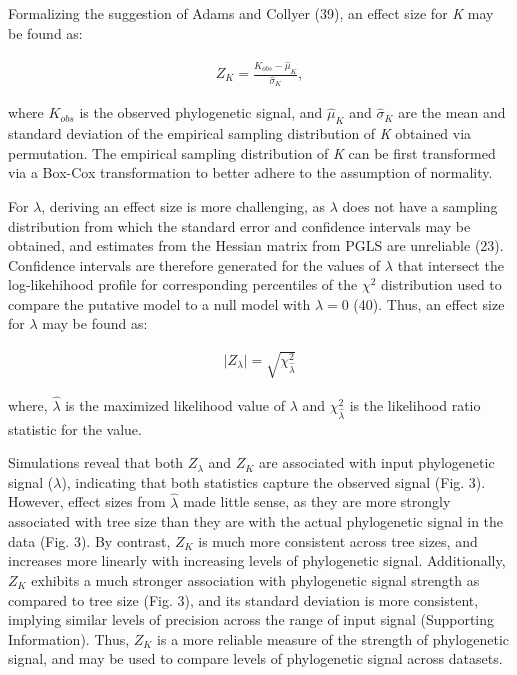 \documentclass[9pt,twocolumn,twoside,lineno]{pnas-new}
\begin{document}
Formalizing the suggestion of Adams and Collyer (39), an effect size for
\emph{K} may be found as:

\begin{align}
    Z_K=\frac{K_{obs}-\hat\mu_{K}}{\hat\sigma_{K}},
\end{align}

where \(K_{obs}\) is the observed phylogenetic signal, and \(\hat\mu_K\)
and \(\hat\sigma_K\) are the mean and standard deviation of the
empirical sampling distribution of \emph{K} obtained via permutation.
The empirical sampling distribution of \emph{K} can be first transformed
via a Box-Cox transformation to better adhere to the assumption of
normality.

For \(\lambda\), deriving an effect size is more challenging, as
\(\lambda\) does not have a sampling distribution from which the
standard error and confidence intervals may be obtained, and estimates
from the Hessian matrix from PGLS are unreliable (23). Confidence
intervals are therefore generated for the values of \(\lambda\) that
intersect the log-likehihood profile for corresponding percentiles of
the \(\chi^2\) distribution used to compare the putative model to a null
model with \(\lambda = 0\) (40). Thus, an effect size for \(\lambda\)
may be found as:

\begin{align}
   \lvert Z_{\lambda} \rvert = \sqrt{\chi^2_{\hat{\lambda}}}
\end{align}

where, \(\hat{\lambda}\) is the maximized likelihood value of
\(\lambda\) and \(\chi^{2}_{\hat{\lambda}}\) is the likelihood ratio
statistic for the value.

Simulations reveal that both \(Z_{\lambda}\) and \(Z_K\) are associated
with input phylogenetic signal (\(\lambda\)), indicating that both
statistics capture the observed signal (Fig. 3). However, effect sizes
from \(\hat{\lambda}\) made little sense, as they are more strongly
associated with tree size than they are with the actual phylogenetic
signal in the data (Fig. 3). By contrast, \(Z_K\) is much more
consistent across tree sizes, and increases more linearly with
increasing levels of phylogenetic signal. Additionally, \(Z_K\) exhibits
a much stronger association with phylogenetic signal strength as
compared to tree size (Fig. 3), and its standard deviation is more
consistent, implying similar levels of precision across the range of
input signal (Supporting Information). Thus, \(Z_K\) is a more reliable
measure of the strength of phylogenetic signal, and may be used to
compare levels of phylogenetic signal across datasets.
\end{document}
